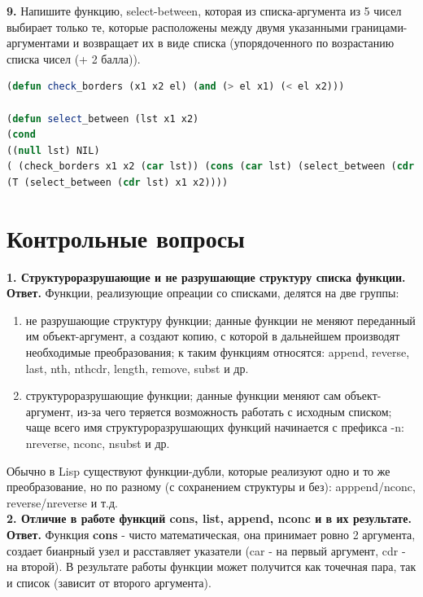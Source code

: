 \documentclass[12pt]{report}
\begin{document}
\textbf{9.}  Напишите функцию, select-between, которая из списка-аргумента из 5 чисел выбирает только те, которые расположены между двумя указанными границами-аргументами и
возвращает их в виде списка (упорядоченного по возрастанию списка чисел (+ 2 балла)).\\
\begin{lstlisting}[label=third,caption=Решение задания №9, language=lisp]
(defun check_borders (x1 x2 el) (and (> el x1) (< el x2)))

(defun select_between (lst x1 x2)
(cond
((null lst) NIL)
( (check_borders x1 x2 (car lst)) (cons (car lst) (select_between (cdr lst) x1 x2)) )
(T (select_between (cdr lst) x1 x2))))
\end{lstlisting}

\section*{Контрольные вопросы}
\textbf{1. Структуроразрушающие и не разрушающие структуру списка функции.}\\

\textbf{Ответ.} 
Функции, реализующие опреации со списками, делятся на две группы:
\begin{enumerate}
    \item не разрушающие структуру функции; данные функции не меняют переданный им объект-аргумент, а создают копию, с которой в дальнейшем производят необходимые преобразования; к таким функциям относятся: append, reverse, last, nth, nthcdr, length, remove, subst и др.
    \item структуроразрушающие функции; данные функции меняют сам объект-аргумент, из-за чего теряется возможность работать с исходным списком; чаще всего имя структуроразрушающих функций начинается с префикса -n: nreverse, nconc, nsubst и др.
\end{enumerate}

Обычно в Lisp существуют функции-дубли, которые реализуют одно и то же преобразование, но по разному (с сохранением структуры и без): apppend/nconc, reverse/nreverse и т.д.\\


\textbf{2. Отличие в работе функций cons, list, append, nconc и в их результате.}\\

\textbf{Ответ.}
Функция \textbf{cons} - чисто математическая, она принимает ровно 2 аргумента, создает бианрный узел и расставляет указатели (car - на первый аргумент, cdr - на второй). В результате работы функции может получится как точечная пара, так и список (зависит от второго аргумента).\\
\end{document}
